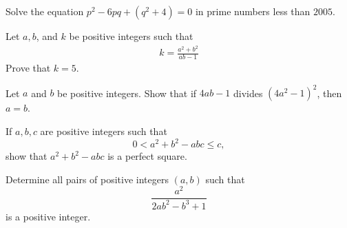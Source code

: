 \documentclass{subfile}
\begin{document}

	\begin{problem}[IZHO 2005] %
		Solve the equation  $ p^2 - 6pq + (q^2 + 4) = 0$ in prime numbers less than $2005$.
	\end{problem}

	\begin{problem}
		Let $ a,b$, and $k $ be positive integers such that
			\begin{align*}
				k=\frac{a^2+b^2}{ab-1}
			\end{align*}
		Prove that $ k=5 $.
	\end{problem}

	\begin{problem}[IMO 2007] %
		Let $a$ and $b$ be positive integers. Show that if $4ab - 1$ divides $(4a^{2} - 1)^{2}$, then $a = b$.
	\end{problem}

	\begin{problem}[PEN] %
		If $a, b, c$ are positive integers such that \[0 < a^{2}+b^{2}-abc \le c,\] show that $a^{2}+b^{2}-abc$ is a perfect square.
	\end{problem}

	\begin{problem} %
		Determine all pairs of positive integers $(a,b)$ such that \[ \dfrac{a^2}{2ab^2-b^3+1} \] is a positive integer.
	\end{problem}
\end{document}
